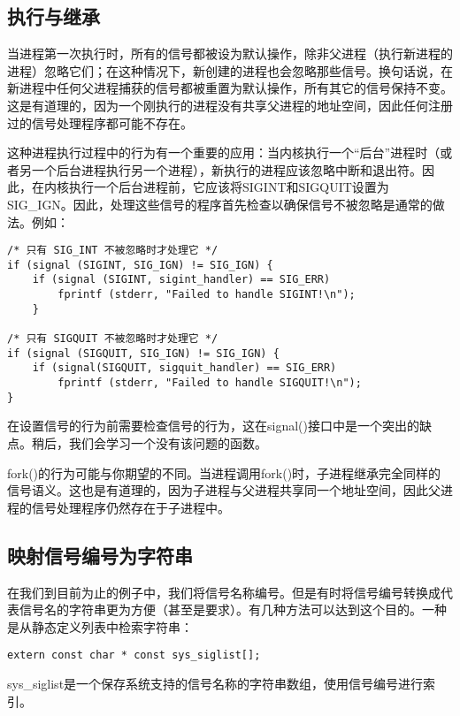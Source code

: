\subsection{执行与继承}

当进程第一次执行时，所有的信号都被设为默认操作，除非父进程（执行新进程的进程）忽略它们；在这种情况下，新创建的进程也会忽略那些信号。换句话说，在新进程中任何父进程捕获的信号都被重置为默认操作，所有其它的信号保持不变。这是有道理的，因为一个刚执行的进程没有共享父进程的地址空间，因此任何注册过的信号处理程序都可能不存在。

这种进程执行过程中的行为有一个重要的应用：当内核执行一个“后台”进程时（或者另一个后台进程执行另一个进程），新执行的进程应该忽略中断和退出符。因此，在内核执行一个后台进程前，它应该将SIGINT和SIGQUIT设置为SIG\_IGN。因此，处理这些信号的程序首先检查以确保信号不被忽略是通常的做法。例如：

\begin{lstlisting}
/* 只有 SIG_INT 不被忽略时才处理它 */
if (signal (SIGINT, SIG_IGN) != SIG_IGN) {
    if (signal (SIGINT, sigint_handler) == SIG_ERR)
        fprintf (stderr, "Failed to handle SIGINT!\n");
    }

/* 只有 SIGQUIT 不被忽略时才处理它 */
if (signal (SIGQUIT, SIG_IGN) != SIG_IGN) {
    if (signal(SIGQUIT, sigquit_handler) == SIG_ERR)
        fprintf (stderr, "Failed to handle SIGQUIT!\n");
}
\end{lstlisting}

在设置信号的行为前需要检查信号的行为，这在signal()接口中是一个突出的缺点。稍后，我们会学习一个没有该问题的函数。

fork()的行为可能与你期望的不同。当进程调用fork()时，子进程继承完全同样的信号语义。这也是有道理的，因为子进程与父进程共享同一个地址空间，因此父进程的信号处理程序仍然存在于子进程中。

\subsection{映射信号编号为字符串}

在我们到目前为止的例子中，我们将信号名称编号。但是有时将信号编号转换成代表信号名的字符串更为方便（甚至是要求）。有几种方法可以达到这个目的。一种是从静态定义列表中检索字符串：

\begin{lstlisting}
extern const char * const sys_siglist[];
\end{lstlisting}

sys\_siglist是一个保存系统支持的信号名称的字符串数组，使用信号编号进行索引。

